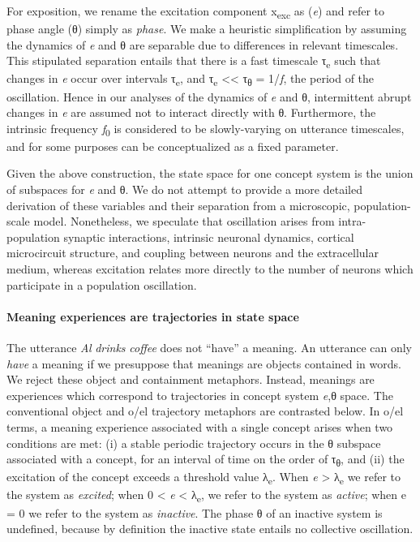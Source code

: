   For exposition, we rename the excitation component x\textsubscript{exc} as (\textit{e}) and refer to phase angle (θ) simply as \textit{phase}. We make a heuristic simplification by assuming the dynamics of \textit{e} and θ are separable due to differences in relevant timescales. This stipulated separation entails that there is a fast timescale τ\textsubscript{e} such that changes in \textit{e} occur over intervals τ\textsubscript{e}, and τ\textsubscript{e} << τ\textsubscript{θ} = 1/\textit{f}, the period of the oscillation. Hence in our analyses of the dynamics of \textit{e} and θ, intermittent abrupt changes in \textit{e} are assumed not to interact directly with θ. Furthermore, the intrinsic frequency \textit{f}\textsubscript{0} is considered to be slowly-varying on utterance timescales, and for some purposes can be conceptualized as a fixed parameter. 

  Given the above construction, the state space for one concept system is the union of subspaces for \textit{e} and θ. We do not attempt to provide a more detailed derivation of these variables and their separation from a microscopic, population-scale model. Nonetheless, we speculate that oscillation arises from intra-population synaptic interactions, intrinsic neuronal dynamics, cortical microcircuit structure, and coupling between neurons and the extracellular medium, whereas excitation relates more directly to the number of neurons which participate in a population oscillation.  

\paragraph{Meaning experiences are trajectories in state space}

The utterance \textit{Al} \textit{drinks} \textit{coffee} does not “have” a meaning. An utterance can only \textit{have} a meaning if we presuppose that meanings are objects contained in words. We reject these object and containment metaphors. Instead, meanings are experiences which correspond to trajectories in concept system \textit{e},θ space. The conventional object and o/el trajectory metaphors are contrasted below. In o/el terms, a meaning experience associated with a single concept arises when two conditions are met: (i) a stable periodic trajectory occurs in the θ subspace associated with a concept, for an interval of time on the order of τ\textsubscript{θ}, and (ii) the excitation of the concept exceeds a threshold value λ\textsubscript{e}. When \textit{e} > λ\textsubscript{e} we refer to the system as \textit{excited}; when 0 < \textit{e} < λ\textsubscript{e}, we refer to the system as \textit{active}; when e = 0 we refer to the system as \textit{inactive}. The phase θ of an inactive system is undefined, because by definition the inactive state entails no collective oscillation. 

